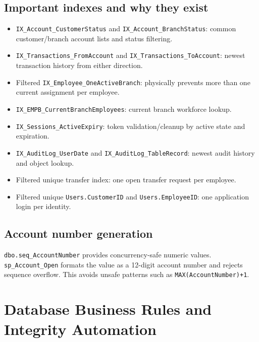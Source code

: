 \documentclass[11pt,a4paper,oneside]{report}
\begin{document}
\section{Important indexes and why they exist}
\begin{itemize}
\item \texttt{IX\_Account\_CustomerStatus} and \texttt{IX\_Account\_BranchStatus}: common customer/branch account lists and status filtering.
\item \texttt{IX\_Transactions\_FromAccount} and \texttt{IX\_Transactions\_ToAccount}: newest transaction history from either direction.
\item Filtered \texttt{IX\_Employee\_OneActiveBranch}: physically prevents more than one current assignment per employee.
\item \texttt{IX\_EMPB\_CurrentBranchEmployees}: current branch workforce lookup.
\item \texttt{IX\_Sessions\_ActiveExpiry}: token validation/cleanup by active state and expiration.
\item \texttt{IX\_AuditLog\_UserDate} and \texttt{IX\_AuditLog\_TableRecord}: newest audit history and object lookup.
\item Filtered unique transfer index: one open transfer request per employee.
\item Filtered unique \texttt{Users.CustomerID} and \texttt{Users.EmployeeID}: one application login per identity.
\end{itemize}

\section{Account number generation}
\texttt{dbo.seq\_AccountNumber} provides concurrency-safe numeric values. \texttt{sp\_Account\_Open} formats the value as a 12-digit account number and rejects sequence overflow. This avoids unsafe patterns such as \texttt{MAX(AccountNumber)+1}.

\chapter{Database Business Rules and Integrity Automation}
\end{document}
